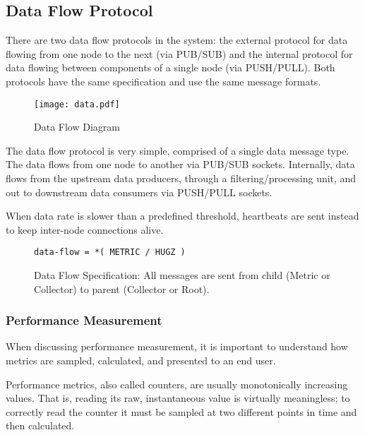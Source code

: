 \subsection{Data Flow Protocol}
\label{proto_data}

There are two data flow protocols in the \dcamp system: the external protocol for data flowing from one node to the next
(via PUB/SUB) and the internal protocol for data flowing between components of a single node (via PUSH/PULL). Both
protocols have the same specification and use the same message formats.

\begin{figure}[H]
    \centering
    \texttt{[image: data.pdf]}
    \caption{Data Flow Diagram}
    \label{fig:proto_data_image}
\end{figure}

The \dcamp data flow protocol is very simple, comprised of a single data message type. The data flows from one node to
another via PUB/SUB sockets. Internally, data flows from the upstream data producers, through a filtering/processing
unit, and out to downstream data consumers via PUSH/PULL sockets.

When data rate is slower than a predefined threshold, heartbeats are sent instead to keep inter-node connections alive.

\begin{figure}[H]
\vspace{+10pt}
\begin{verbatim}
data-flow = *( METRIC / HUGZ )
\end{verbatim}
\vspace{-5pt}
\caption[Data Flow Specification]
	{Data Flow Specification: All messages are sent from child (Metric or Collector) to parent (Collector or Root).}
\label{fig:proto_data_spec}
\end{figure}

\subsubsection{Performance Measurement}

When discussing performance measurement, it is important to understand how metrics are sampled, calculated, and
presented to an end user.

Performance metrics, also called counters, are usually monotonically increasing values. That is, reading its raw,
instantaneous value is virtually meaningless; to correctly read the counter it must be sampled at two different points
in time and then calculated.

